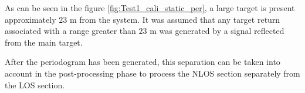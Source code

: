 As can be seen in the figure \ref{fig:Test1_cali_static_per}, a large target is present approximately $23$ m from the system. It was assumed that any target return associated with a range greater than $23$ m was generated by a signal reflected from the main target.

After the periodogram has been generated, this separation can be taken into account in the post-processing phase to process the NLOS section separately from the LOS section.



